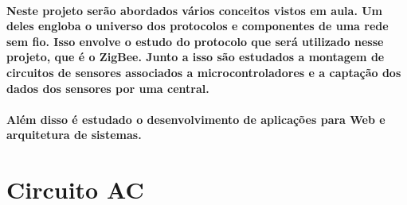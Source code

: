 \label{Cap:conceitos}
\paragraph{
Neste projeto serão abordados vários conceitos vistos em aula. Um deles engloba o universo dos protocolos e componentes de uma rede sem fio. Isso envolve o estudo do protocolo que será utilizado nesse projeto, que é o ZigBee. Junto a isso são estudados a montagem de circuitos de sensores associados a microcontroladores e a captação dos dados dos sensores por uma central.
}
\paragraph{
Além disso é estudado o desenvolvimento de aplicações para Web e arquitetura de sistemas.
}
\section{Circuito AC}
\label{Sec:ac}

